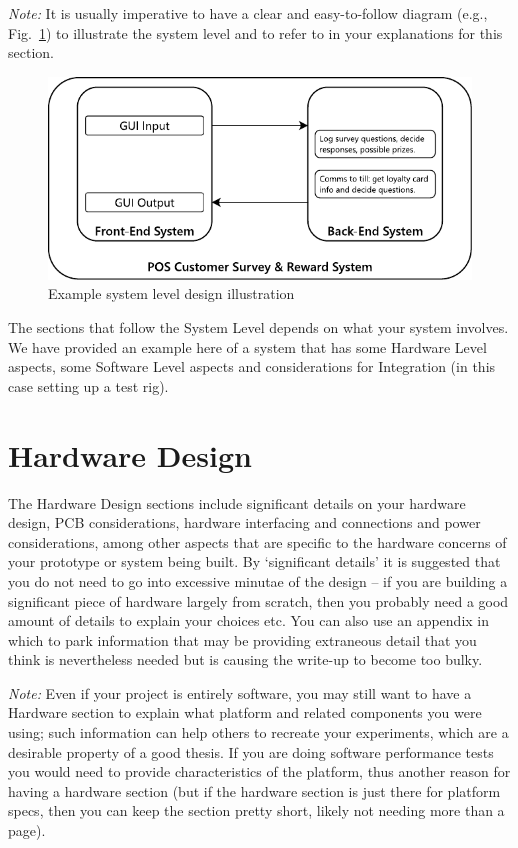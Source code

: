 \emph{Note:} It is usually imperative to have a clear and easy-to-follow diagram (e.g., Fig.~\ref{fig:system_design}) to illustrate the system level and to refer to in your explanations for this section.

\begin{figure}[ht]
\centering
\includegraphics{3_Chapters/4_Chapter_Design/Figures/system_design.pdf}
\caption{Example system level design illustration}
\label{fig:system_design}
\end{figure}

The sections that follow the System Level depends on what your system involves. We have provided an example here of a system that has some Hardware Level aspects, some Software Level aspects and considerations for Integration (in this case setting up a test rig).

\section{Hardware Design}
\label{sec:Design/HardwareDesign}

The Hardware Design sections include significant details on your hardware design, PCB considerations, hardware interfacing and connections and power considerations, among other aspects that are specific to the hardware concerns of your prototype or system being built.  By `significant details' it is suggested that you do not need to go into excessive minutae of the design -- if you are building a significant piece of hardware largely from scratch, then you probably need a good amount of details to explain your choices etc.  You can also use an appendix in which to park information that may be providing extraneous detail that you think is nevertheless needed but is causing the write-up to become too bulky.

\emph{Note:} Even if your project is entirely software, you may still want to have a Hardware section to explain what platform and related components you were using; such information can help others to recreate your experiments, which are a desirable property of a good thesis.  If you are doing software performance tests you would need to provide characteristics of the platform, thus another reason for having a hardware section (but if the hardware section is just there for platform specs, then you can keep the section pretty short, likely not needing more than a page).

